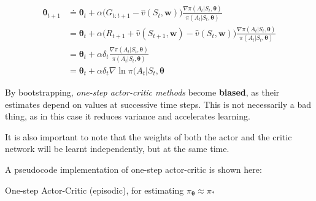 \begin{equation}
    \begin{split}
        \boldsymbol{\theta}_{t+1} &\doteq \boldsymbol{\theta}_t + \alpha \big(G_{t:t+1} - \hat{v}(S_t,\boldsymbol{w}) \big) \frac{\nabla \pi (A_t \vert S_t, \boldsymbol{\theta})}{\pi (A_t \vert S_t, \boldsymbol{\theta})} \\
        &= \boldsymbol{\theta}_t + \alpha \big(R_{t+1} + \hat{v}(S_{t+1},\boldsymbol{w}) - \hat{v}(S_t,\boldsymbol{w}) \big) \frac{\nabla \pi (A_t \vert S_t, \boldsymbol{\theta})}{\pi (A_t \vert S_t, \boldsymbol{\theta})} \\
        &= \boldsymbol{\theta}_t + \alpha \delta_t \frac{\nabla \pi (A_t \vert S_t, \boldsymbol{\theta})}{\pi (A_t \vert S_t, \boldsymbol{\theta})} \\
        &= \boldsymbol{\theta}_t + \alpha \delta_t \nabla \ln{\pi (A_t \vert S_t, \boldsymbol{\theta}}
    \end{split}
    \label{eq:ch8-onestepactorcriticupdaterule}
\end{equation}

By bootstrapping, \textit{one-step actor-critic methods} become \textbf{biased}, as their estimates depend on values at successive time steps. This is not necessarily a bad thing, as in this case it reduces variance and accelerates learning.

It is also important to note that the weights of both the actor and the critic network will be learnt independently, but at the same time.

A pseudocode implementation of one-step actor-critic is shown here:

\begin{algorithm}[H]
\DontPrintSemicolon
\SetAlgoVlined
{}

\caption{One-step Actor-Critic (episodic), for estimating $\pi_{\boldsymbol{\theta}} \approx \pi_*$}
\end{algorithm}

